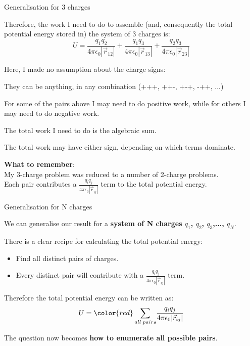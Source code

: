 %
%
%

\begin{frame}{Generalisation for 3 charges}

Therefore, the work I need to do to assemble
(and, consequently the total potential energy stored in)
the system of 3 charges is:
\begin{equation*}
  U = \frac{q_1 q_2}{4\pi\epsilon_0 |\vec{r}_{12}|} +
      \frac{q_1 q_3}{4\pi\epsilon_0 |\vec{r}_{13}|} +
      \frac{q_2 q_3}{4\pi\epsilon_0 |\vec{r}_{23}|}
\end{equation*}

Here, I made no assumption about the charge signs:
\begin{itemize}
{\small
   \item They can be anything, in any combination (+++, ++-, +-+, -++, ...)
   \item For some of the pairs above I may need to do positive work, while for others I may need to do negative work.
   \item The total work I need to do is the algebraic sum.
   \item The total work may have either sign, depending on which terms dominate.
}
\end{itemize}

\vspace{0.4cm}
{\bf What to remember}: \\
My 3-charge problem was reduced to a number of 2-charge problems. \\
Each pair contributes a $\frac{q_i q_j}{4\pi \epsilon_0 |\vec{r}_{ij}|}$ term to the total potential energy.\\

\end{frame}

%
%
%

\begin{frame}{Generalisation for N charges}

We can generalise our result for a {\bf system of N charges $q_1$, $q_2$, $q_3$,..., $q_N$}.\\
\vspace{0.2cm}

There is a clear recipe for calculating the total potential energy:
\begin{itemize}
  \item Find all distinct pairs of charges.
  \item Every distinct pair will contribute with a $\frac{q_i q_j}{4\pi \epsilon_0 |\vec{r}_{ij}|}$ term.\\
\end{itemize}
\vspace{0.2cm}

Therefore the total potential energy can be written as:
\begin{equation*}
  U = {\color{red} \sum_{all\; pairs}} \frac{q_i q_j}{4\pi \epsilon_0 |\vec{r}_{ij}|}
\end{equation*}

\vspace{0.2cm}
The question now becomes {\bf how to enumerate all possible pairs}.

\end{frame}

